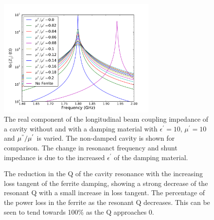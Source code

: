 \begin{figure}
\begin{center}
\includegraphics[width=0.7\textwidth]{Beam_Coupling_Impedance_Reduction_Techniques/figures/no_screen_long_imp_all.pdf}
\end{center}
\caption{The real component of the longitudinal beam coupling impedance of a cavity without and with a damping material with $\epsilon^{'}=10$, $\mu^{'}=10$ and $\mu^{"}/\mu^{'}$ is varied. The non-damped cavity is shown for comparison. The change in resonanct frequency and shunt impedance is due to the increased $\epsilon^{'}$ of the damping material.}
\label{fig:no_screen_long_imp}
\end{figure}

\begin{figure}
\caption{ The reduction in the Q of the cavity resonance with the increasing loss tangent of the ferrite damping, showing a strong decrease of the resonant Q with a small increase in loss tangent.  The percentage of the power loss in the ferrite as the resonant Q decreases. This can be seen to tend towards 100\% as the Q approaches 0.}
\label{fig:no_screen_res_alterations}
\end{figure}


